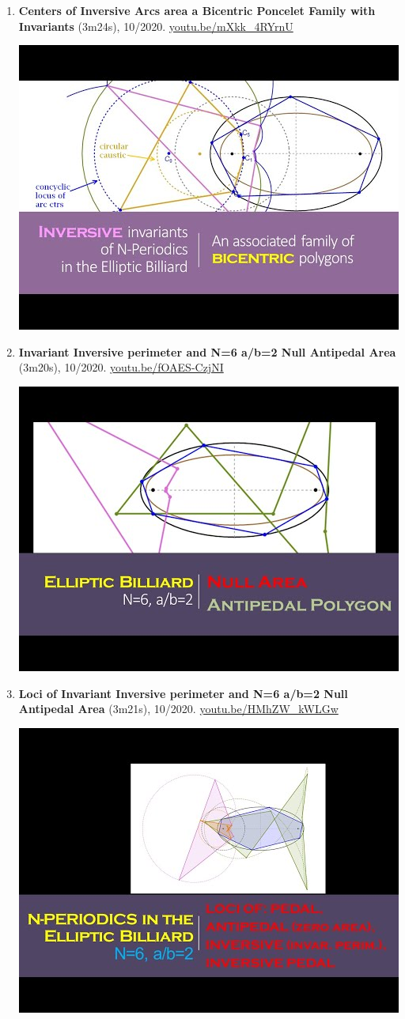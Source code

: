 \documentclass[12pt]{article}
\begin{document}
\begin{enumerate}[resume]
% 
\item \textbf{Centers of Inversive Arcs area a Bicentric Poncelet Family with Invariants} (3m24s), 10/2020. \href{https://youtu.be/mXkk_4RYrnU}{\url{youtu.be/mXkk\_4RYrnU}}
\begin{center}\includegraphics[width=.5\textwidth]{pics/mXkk_4RYrnU.jpg}\end{center}
% 
\item \textbf{Invariant Inversive perimeter and N=6 a/b=2 Null Antipedal Area} (3m20s), 10/2020. \href{https://youtu.be/fOAES-CzjNI}{\url{youtu.be/fOAES-CzjNI}}
\begin{center}\includegraphics[width=.5\textwidth]{pics/fOAES-CzjNI.jpg}\end{center}
% 
\item \textbf{Loci of Invariant Inversive perimeter and N=6 a/b=2 Null Antipedal Area} (3m21s), 10/2020. \href{https://youtu.be/HMhZW_kWLGw}{\url{youtu.be/HMhZW\_kWLGw}}
\begin{center}\includegraphics[width=.5\textwidth]{pics/HMhZW_kWLGw.jpg}\end{center}

\end{enumerate}
\end{document}
